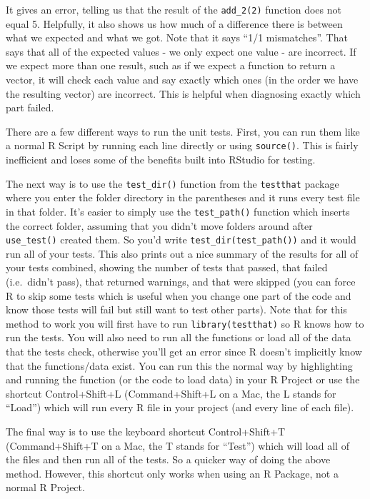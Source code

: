 \documentclass[
  12pt,
  openany]{book}
\begin{document}
It gives an error, telling us that the result of the \texttt{add\_2(2)} function does not equal 5. Helpfully, it also shows us how much of a difference there is between what we expected and what we got. Note that it says ``1/1 mismatches''. That says that all of the expected values - we only expect one value - are incorrect. If we expect more than one result, such as if we expect a function to return a vector, it will check each value and say exactly which ones (in the order we have the resulting vector) are incorrect. This is helpful when diagnosing exactly which part failed.

There are a few different ways to run the unit tests. First, you can run them like a normal R Script by running each line directly or using \texttt{source()}. This is fairly inefficient and loses some of the benefits built into RStudio for testing.

The next way is to use the \texttt{test\_dir()} function from the \texttt{testthat} package where you enter the folder directory in the parentheses and it runs every test file in that folder. It's easier to simply use the \texttt{test\_path()} function which inserts the correct folder, assuming that you didn't move folders around after \texttt{use\_test()} created them. So you'd write \texttt{test\_dir(test\_path())} and it would run all of your tests. This also prints out a nice summary of the results for all of your tests combined, showing the number of tests that passed, that failed (i.e.~didn't pass), that returned warnings, and that were skipped (you can force R to skip some tests which is useful when you change one part of the code and know those tests will fail but still want to test other parts). Note that for this method to work you will first have to run \texttt{library(testthat)} so R knows how to run the tests. You will also need to run all the functions or load all of the data that the tests check, otherwise you'll get an error since R doesn't implicitly know that the functions/data exist. You can run this the normal way by highlighting and running the function (or the code to load data) in your R Project or use the shortcut Control+Shift+L (Command+Shift+L on a Mac, the L stands for ``Load'') which will run every R file in your project (and every line of each file).

The final way is to use the keyboard shortcut Control+Shift+T (Command+Shift+T on a Mac, the T stands for ``Test'') which will load all of the files and then run all of the tests. So a quicker way of doing the above method. However, this shortcut only works when using an R Package, not a normal R Project.
\end{document}
